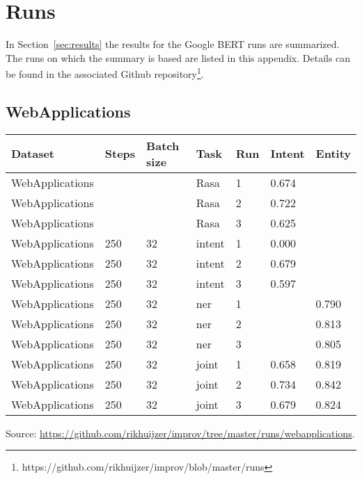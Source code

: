 \chapter{Runs}
\label{ch:runs}

In Section~\ref{sec:results} the results for the Google BERT runs are summarized.
The runs on which the summary is based are listed in this appendix.
Details can be found in the associated Github repository\footnote{https://github.com/rikhuijzer/improv/blob/master/runs}.\\

\section{WebApplications}
\label{sec:runs_webapplications}
\begin{center}
    \begin{tabular}{l l l l l l l}
        \textbf{Dataset} & \textbf{Steps} & \textbf{Batch size} & \textbf{Task} & \textbf{Run} & \textbf{Intent} & \textbf{Entity} \\
        \hline
        WebApplications & & & Rasa & 1 & 0.674 \\
        WebApplications & & & Rasa & 2 & 0.722 \\
        WebApplications & & & Rasa & 3 & 0.625 \\
        WebApplications & 250 & 32 & intent & 1 & 0.000 \\
        WebApplications & 250 & 32 & intent & 2 & 0.679 \\
        WebApplications & 250 & 32 & intent & 3 & 0.597 \\
        WebApplications & 250 & 32 & ner & 1 & & 0.790 \\
        WebApplications & 250 & 32 & ner & 2 & & 0.813 \\
        WebApplications & 250 & 32 & ner & 3 & & 0.805 \\
        WebApplications & 250 & 32 & joint & 1 & 0.658 & 0.819 \\
        WebApplications & 250 & 32 & joint & 2 & 0.734 & 0.842 \\
        WebApplications & 250 & 32 & joint & 3 & 0.679 & 0.824 \\
    \end{tabular}
\end{center}

\noindent Source: \url{https://github.com/rikhuijzer/improv/tree/master/runs/webapplications}.

